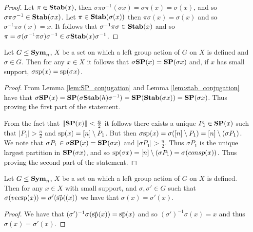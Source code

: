 \documentclass[../paper.tex]{subfiles}
\begin{document}
\begin{proof}
  Let $\pi \in \text{\textbf{Stab}}(x)$, then $\sigma \pi \sigma^{-1}(\sigma x) = \sigma \pi
  (x) = \sigma (x)$, and so $\sigma \pi \sigma^{-1} \in \text{\textbf{Stab}}(\sigma x)$. Let
  $\pi \in \text{\textbf{Stab}}(\sigma (x))$ then $\pi \sigma (x) = \sigma (x)$ and so
  $\sigma^{-1} \pi \sigma (x) = x$. It follows that $\sigma^{-1} \pi \sigma \in
  \text{\textbf{Stab}}(x)$ and so $\pi = \sigma (\sigma^{-1} \pi \sigma) \sigma ^{-1} \in
  \sigma \text{\textbf{Stab}}(x) \sigma^{-1}$.
\end{proof}

\begin{lem}
  \label{lem:support_mapping}
  Let $G \leq \text{\textbf{Sym}}_n$, $X$ be a set on which a left group action
  of $G$ on $X$ is defined and $\sigma \in G$. Then for any $x \in X$ it follows
  that $\sigma \text{\textbf{SP}} (x) = \text{\textbf{SP}} (\sigma x)$ and, if $x$ has small support, $\sigma
  \text{sp} (x) = \text{sp} (\sigma x)$.
\end{lem}
\begin{proof}
  From Lemma \ref{lem:SP_conjugation} and Lemma \ref{lem:stab_conjugation} have
  that $\sigma \text{\textbf{SP}} (x) = \text{\textbf{SP}}(\sigma \text{\textbf{Stab}}(h) \sigma^{-1}) = \text{\textbf{SP}} (\text{\textbf{Stab}}(\sigma
  x)) = \text{\textbf{SP}} (\sigma x)$. Thus proving the first part of the statement.

  From the fact that $\| \text{\textbf{SP}}(x) \| < \frac{n}{2}$ it follows there exists a
  unique $P_1 \in \text{\textbf{SP}}(x)$ such that $\vert P_1 \vert > \frac{n}{2}$ and
  $\text{sp}(x) = [n] \setminus P_1$. But then $\sigma \text{sp} (x) = \sigma([n]
  \setminus P_1) = [n] \setminus (\sigma P_1)$. We note that $\sigma P_1 \in
  \sigma \text{\textbf{SP}} (x) = \text{\textbf{SP}}(\sigma x)$ and $\vert \sigma P_1 \vert > \frac{n}{2}$.
  Thus $\sigma P_1$ is the unique largest partition in $\text{\textbf{SP}}(\sigma x)$, and so
  $\text{sp}(\sigma x) = [n]\setminus (\sigma P_1) = \sigma (consp(x))$. Thus
  proving the second part of the statement.
\end{proof}

\begin{lem}
  Let $G \leq \text{\textbf{Sym}}_n$, $X$ be a set on which a left group action
  of $G$ on $X$ is defined. Then for any $x \in X$ with small support, and
  $\sigma, \sigma' \in G$ such that $\sigma (vec{\text{sp}}(x)) = \sigma'
  (\vec{\text{sp}}((x))$ we have that $\sigma (x) = \sigma'(x)$.
\end{lem}
\begin{proof}
  We have that $(\sigma')^{-1}\sigma(\vec{\text{sp}}(x)) = \vec{\text{sp}}(x)$ and so
  $(\sigma')^{-1} \sigma (x) = x$ and thus $\sigma (x) = \sigma' (x)$.
\end{proof}
\end{document}
